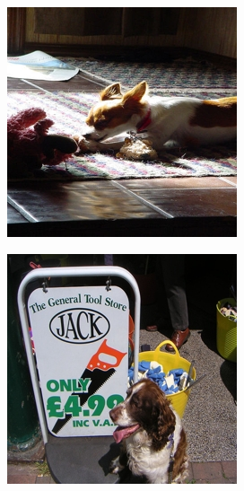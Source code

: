 \documentclass[10pt,two column,letter paper]{article}
\begin{document}
\begin{figure}[t]
\begin{center}
\includegraphics[width=0.9\linewidth]{chihuahua.JPEG}
\end{center}
   \caption{}
\label{fig:chihuahua}
\end{figure}

\begin{figure}[t]
\begin{center}
\includegraphics[width=0.9\linewidth]{English_springer.JPEG}
\end{center}
   \caption{}
\label{fig:English_springer}
\end{figure}
\end{document}
